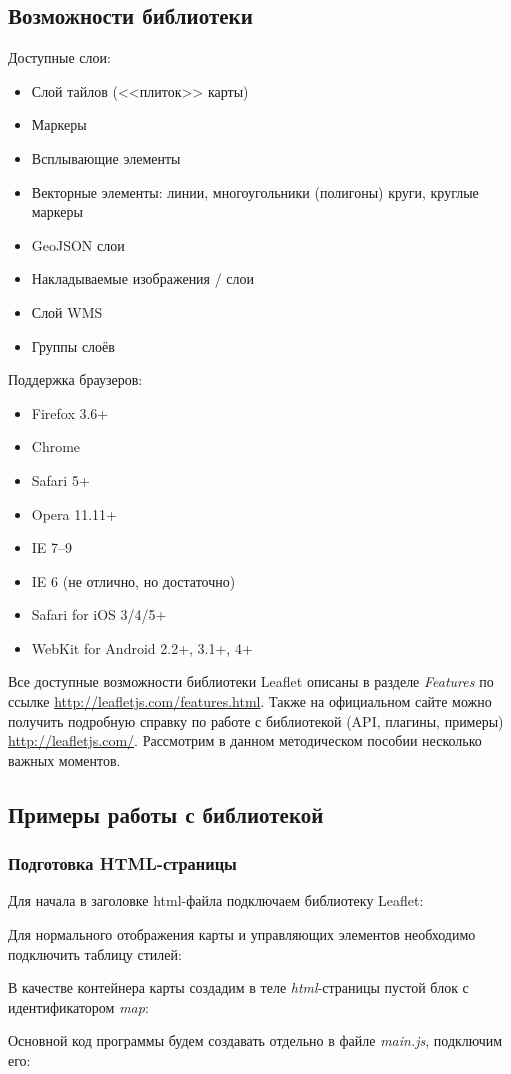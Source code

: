 \subsection{Возможности библиотеки}
Доступные слои:
\begin{itemize}
    \item Слой тайлов (<<плиток>> карты)
    \item Маркеры
    \item Всплывающие элементы
    \item Векторные элементы: линии, многоугольники (полигоны) круги, круглые 
        маркеры
    \item GeoJSON слои
    \item Накладываемые изображения / слои
    \item Слой WMS
    \item Группы слоёв
\end{itemize}

Поддержка браузеров:
\begin{itemize}
    \item Firefox 3.6+
    \item Chrome
    \item Safari 5+
    \item Opera 11.11+
    \item IE 7–9
    \item IE 6 (не отлично, но достаточно)
    \item Safari for iOS 3/4/5+
    \item WebKit for Android 2.2+, 3.1+, 4+
\end{itemize}

Все доступные возможности библиотеки Leaflet описаны в разделе 
\emph{Features} по ссылке \url{http://leafletjs.com/features.html}. 
Также на официальном сайте можно получить подробную справку по 
работе с библиотекой (API, плагины, примеры) \url{http://leafletjs.com/}. 
Рассмотрим в данном методическом пособии несколько важных моментов.

\subsection{Примеры работы с библиотекой}
\subsubsection{Подготовка HTML-страницы}
Для начала в заголовке html-файла подключаем библиотеку Leaflet:

Для нормального отображения карты и управляющих элементов необходимо 
подключить таблицу стилей:

В качестве контейнера карты создадим в теле \emph{html}-страницы пустой блок с 
идентификатором \emph{map}:

Основной код программы будем создавать отдельно в файле \emph{main.js}, 
подключим его:


